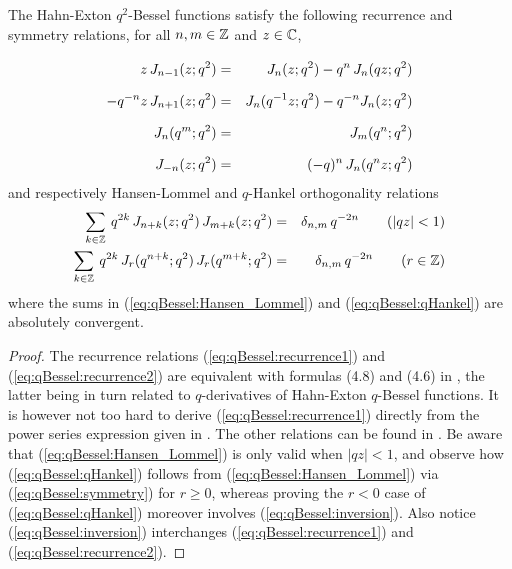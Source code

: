 \begin{prop} \label{prop:qbessel:properties}
The Hahn-Exton $q^2$-Bessel functions satisfy the following
recurrence and symmetry relations,
for all $n,m \in \mathbb{Z}$ and $z\in\mathbb{C}$,
\begin{eqnarray}
 z\,\J{n-1}{z} &=& \J{n}{z} - q^n\,\J{n}{qz} \vertXL
     \label{eq:qBessel:recurrence1} \\
 -q^{-n} z\, \J{n+1}{z} &=& \J{n}{q^{-1}z} - q^{-n} \J{n}{z} \vertXL
    \label{eq:qBessel:recurrence2} \\
 \J{n}{q^m} &=& \J{m}{q^n} \vertXL
    \label{eq:qBessel:symmetry}\\
 \J{-n}{z} &=& (-q)^n\, \J{n}{q^n z} \vertXL
    \label{eq:qBessel:inversion}
\end{eqnarray}
and respectively Hansen-Lommel and $q$-Hankel orthogonality relations
\begin{eqnarray}
 \sum_{k\in \mathbb{Z}} \: q^{2k}\, J_{n+k}(z; q^2) \,J_{m+k}(z; q^2)
  &=& \delta_{n,m} \,q^{-2n} \hspace{2em}  (|qz|<1)
      \label{eq:qBessel:Hansen_Lommel} \\
 \sum_{k\in \mathbb{Z}} \: q^{2k} \,J_{r}(q^{n+k}; q^2) \,J_{r}(q^{m+k}; q^2)
  &=& \delta_{n,m} \,q^{-2n} \hspace{2em}  (r\in\mathbb{Z})
      \label{eq:qBessel:qHankel}
\end{eqnarray}
where the sums in (\ref{eq:qBessel:Hansen_Lommel}) and (\ref{eq:qBessel:qHankel})
are absolutely convergent.
\end{prop}
\begin{proof}
The recurrence relations (\ref{eq:qBessel:recurrence1}) and (\ref{eq:qBessel:recurrence2})
are equivalent with formulas (4.8) and (4.6) in
\cite{KoelinkSwart:qBessel:zeros}, the latter being in turn
related to $q$-derivatives of Hahn-Exton $q$-Bessel functions.
It is however not too hard to derive (\ref{eq:qBessel:recurrence1})
directly from the power series expression given in
\cite[proof of prop.\ 2.1]{KoornwSwartt}\@.
The other relations can be found in
\cite{Koelink:thesis,Koelink:QE2,KoornwSwartt,Swarttouw}\@.
Be aware that (\ref{eq:qBessel:Hansen_Lommel}) is only valid when
$|qz|<1$, and observe how (\ref{eq:qBessel:qHankel})
follows from (\ref{eq:qBessel:Hansen_Lommel}) via
(\ref{eq:qBessel:symmetry}) for $r\geq 0$, whereas proving the $r<0$ case of
(\ref{eq:qBessel:qHankel}) moreover involves (\ref{eq:qBessel:inversion}).
Also notice (\ref{eq:qBessel:inversion}) interchanges
(\ref{eq:qBessel:recurrence1}) and (\ref{eq:qBessel:recurrence2}).
\end{proof}


